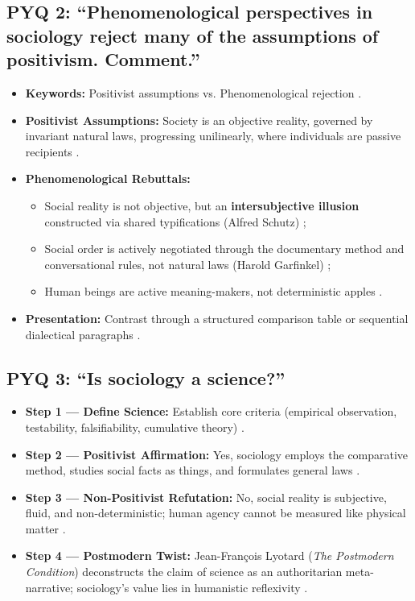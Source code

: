 \subsection{PYQ 2: ``Phenomenological perspectives in sociology reject many of the assumptions of positivism. Comment.''}
\begin{itemize}
    \item \textbf{Keywords:} Positivist assumptions vs. Phenomenological rejection .
    \item \textbf{Positivist Assumptions:} Society is an objective reality, governed by invariant natural laws, progressing unilinearly, where individuals are passive recipients .
    \item \textbf{Phenomenological Rebuttals:}
    \begin{itemize}
        \item Social reality is not objective, but an \textbf{intersubjective illusion} constructed via shared typifications (Alfred Schutz) ;
        \item Social order is actively negotiated through the documentary method and conversational rules, not natural laws (Harold Garfinkel) ;
        \item Human beings are active meaning-makers, not deterministic apples .
    \end{itemize}
    \item \textbf{Presentation:} Contrast through a structured comparison table or sequential dialectical paragraphs .
\end{itemize}

\subsection{PYQ 3: ``Is sociology a science?''}
\begin{itemize}
    \item \textbf{Step 1 --- Define Science:} Establish core criteria (empirical observation, testability, falsifiability, cumulative theory) .
    \item \textbf{Step 2 --- Positivist Affirmation:} Yes, sociology employs the comparative method, studies social facts as things, and formulates general laws .
    \item \textbf{Step 3 --- Non-Positivist Refutation:} No, social reality is subjective, fluid, and non-deterministic; human agency cannot be measured like physical matter .
    \item \textbf{Step 4 --- Postmodern Twist:} Jean-François Lyotard (\textit{The Postmodern Condition}) deconstructs the claim of science as an authoritarian meta-narrative; sociology's value lies in humanistic reflexivity .
\end{itemize}


